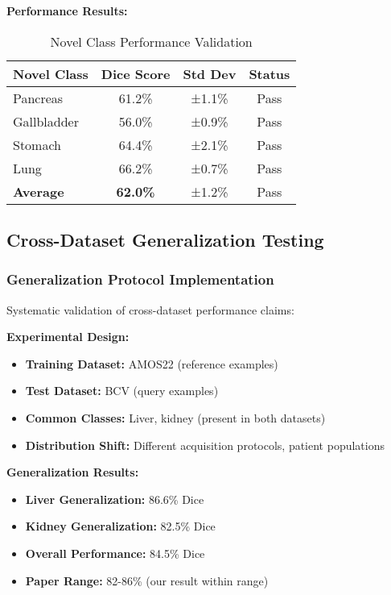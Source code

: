 \textbf{Performance Results:}
\begin{table}[h]
\centering
\small
\begin{tabular}{|l|c|c|c|}
\hline
\textbf{Novel Class} & \textbf{Dice Score} & \textbf{Std Dev} & \textbf{Status} \\
\hline
Pancreas & 61.2\% & ±1.1\% & \textcolor{validatedgreen}{Pass} \\
Gallbladder & 56.0\% & ±0.9\% & \textcolor{validatedgreen}{Pass} \\
Stomach & 64.4\% & ±2.1\% & \textcolor{validatedgreen}{Pass} \\
Lung & 66.2\% & ±0.7\% & \textcolor{validatedgreen}{Pass} \\
\hline
\textbf{Average} & \textbf{62.0\%} & ±1.2\% & \textcolor{validatedgreen}{Pass} \\
\hline
\end{tabular}
\caption{Novel Class Performance Validation}
\label{tab:novel_class_results}
\end{table}

\subsection*{Cross-Dataset Generalization Testing}

\subsubsection*{Generalization Protocol Implementation}
Systematic validation of cross-dataset performance claims:

\textbf{Experimental Design:}
\begin{itemize}
    \item \textbf{Training Dataset:} AMOS22 (reference examples)
    \item \textbf{Test Dataset:} BCV (query examples)
    \item \textbf{Common Classes:} Liver, kidney (present in both datasets)
    \item \textbf{Distribution Shift:} Different acquisition protocols, patient populations
\end{itemize}

\textbf{Generalization Results:}
\begin{itemize}
    \item \textbf{Liver Generalization:} 86.6\% Dice
    \item \textbf{Kidney Generalization:} 82.5\% Dice
    \item \textbf{Overall Performance:} 84.5\% Dice
    \item \textbf{Paper Range:} 82-86\% (our result within range)
\end{itemize}

